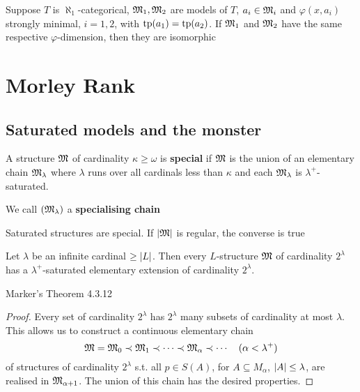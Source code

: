 \documentclass[11pt]{article}
\begin{document}
\begin{corollary}[]
Suppose \(T\) is \(\aleph_1\)-categorical, \(\mathfrak{M}_1,\mathfrak{M}_2\) are models of \(T\), \(a_i\in\mathfrak{M}_i\) and \(\varphi(x,a_i)\)
strongly minimal, \(i=1,2\), with \(\operatorname{tp}(a_1)=\operatorname{tp}(a_2)\). If \(\mathfrak{M}_1\) and \(\mathfrak{M}_2\) have the same
respective \(\varphi\)-dimension, then they are isomorphic
\end{corollary}
\section{Morley Rank}
\label{sec:orgb8aeb22}
\subsection{Saturated models and the monster}
\label{sec:orgd79f94f}
\begin{definition}[]
A structure \(\mathfrak{M}\) of cardinality \(\kappa\ge\omega\) is \textbf{special} if \(\mathfrak{M}\) is the union of an elementary
chain \(\mathfrak{M}_\lambda\) where \(\lambda\) runs over all cardinals less than \(\kappa\) and each \(\mathfrak{M}_\lambda\) is \(\lambda^+\)-saturated.
\end{definition}


We call \((\mathfrak{M}_\lambda)\) a \textbf{specialising chain}

\begin{remark}
Saturated structures are special. If \(\abs{\fM}\) is regular, the converse is true \label{Problem8}
\end{remark}

\begin{lemma}[]
Let \(\lambda\) be an infinite cardinal \(\ge\abs{L}\). Then every \(L\)-structure \(\mathfrak{M}\) of
cardinality \(2^\lambda\) has a \(\lambda^+\)-saturated elementary extension of cardinality \(2^\lambda\).
\end{lemma}

Marker's Theorem 4.3.12

\begin{proof}
Every set of cardinality \(2^\lambda\) has \(2^\lambda\) many subsets of cardinality at most \(\lambda\).
This allows us to construct a continuous elementary chain
\begin{equation*}
\mathfrak{M}=\mathfrak{M}_0\prec\mathfrak{M}_1\prec\cdots\prec\mathfrak{M}_\alpha\prec\cdots\quad(\alpha<\lambda^+)
\end{equation*}
of structures of cardinality \(2^\lambda\) s.t. all \(p\in S(A)\), for \(A\subseteq M_\alpha\), \(\abs{A}\le\lambda\), are
realised in \(\mathfrak{M}_{\alpha+1}\). The union of this chain has the desired properties.
\end{proof}
\end{document}
